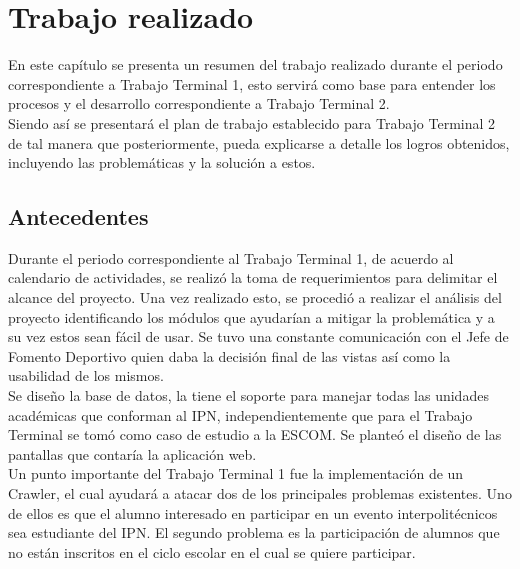 \chapter{Trabajo realizado}

	\noindent En este capítulo se presenta un resumen del trabajo realizado durante el periodo correspondiente a Trabajo Terminal 1, esto servirá como base para entender los procesos y el desarrollo correspondiente a Trabajo Terminal 2.\\
	\noindent Siendo así se presentará el plan de trabajo establecido para Trabajo Terminal 2 de tal manera que posteriormente, pueda explicarse a detalle los logros obtenidos, incluyendo las problemáticas y la solución a estos. \\
	
	\section{Antecedentes}
	\noindent Durante el periodo correspondiente al Trabajo Terminal 1, de acuerdo al calendario de actividades, se realizó la toma de requerimientos para delimitar el alcance del proyecto. Una vez realizado esto, se procedió a realizar el análisis del proyecto identificando los módulos que ayudarían a mitigar la problemática y a su vez estos sean fácil de usar. Se tuvo una constante comunicación con el Jefe de Fomento Deportivo quien daba la decisión final de las vistas así como la usabilidad de los mismos.\\
	
	\noindent Se diseño la base de datos, la tiene el soporte para manejar todas las unidades académicas que conforman al IPN, independientemente que para el Trabajo Terminal se tomó como caso de estudio a la ESCOM. Se planteó el diseño de las pantallas que contaría la aplicación web.\\
	
	\noindent Un punto importante del Trabajo Terminal 1 fue la implementación de un Crawler, el cual ayudará a atacar dos de los principales problemas existentes. Uno de ellos es que el alumno interesado en participar en un evento interpolitécnicos sea estudiante del IPN. El segundo problema es la participación de alumnos que no están inscritos en el ciclo escolar en el cual se quiere participar.
	
